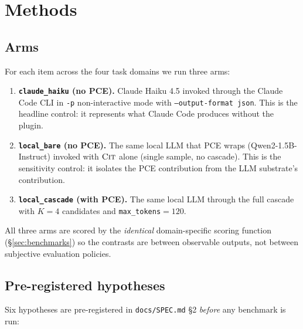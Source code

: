 \section{Methods}\label{sec:methods}

\subsection{Arms}

For each item across the four task domains we run three arms:
\begin{enumerate}[leftmargin=1.4em]
\item \textbf{\texttt{claude\_haiku} (no PCE).} Claude Haiku 4.5 invoked through the Claude Code CLI in \texttt{-p} non-interactive mode with \texttt{--output-format json}. This is the headline control: it represents what Claude Code produces without the plugin.
\item \textbf{\texttt{local\_bare} (no PCE).} The same local LLM that PCE wraps (Qwen2-1.5B-Instruct) invoked with $\textsc{Cit}$ alone (single sample, no cascade). This is the sensitivity control: it isolates the PCE contribution from the LLM substrate's contribution.
\item \textbf{\texttt{local\_cascade} (with PCE).} The same local LLM through the full cascade with $K=4$ candidates and \texttt{max\_tokens}$=120$.
\end{enumerate}
All three arms are scored by the \emph{identical} domain-specific scoring function (\S\ref{sec:benchmarks}) so the contrasts are between observable outputs, not between subjective evaluation policies.

\subsection{Pre-registered hypotheses}

Six hypotheses are pre-registered in \texttt{docs/SPEC.md} \S2 \emph{before} any benchmark is run:

